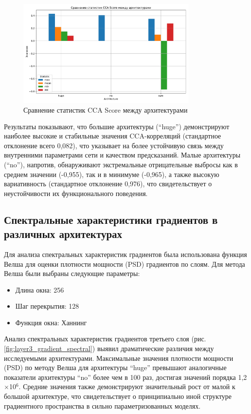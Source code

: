 \documentclass[a4paper,12pt]{article}
\begin{document}
\begin{figure}[ht]
  \centering
  \includegraphics[width=0.8\textwidth]{resources/cca_score_statistics_comparison.pdf}
  \caption{Сравнение статистик CCA Score между архитектурами}
  \label{fig:cca_score_comparison}
\end{figure}

Результаты показывают, что большие архитектуры (``huge'') демонстрируют наиболее высокие и стабильные
значения CCA-корреляций (стандартное отклонение всего 0,082), что указывает на более устойчивую связь между
внутренними параметрами сети и качеством предсказаний. Малые архитектуры (``no''), напротив, обнаруживают
экстремальные отрицательные выбросы как в среднем значении (-0,955), так и в минимуме (-0,965), а также
высокую вариативность (стандартное отклонение 0,976), что свидетельствует о неустойчивости их функционального поведения.

\subsection{Спектральные характеристики градиентов в различных архитектурах}

Для анализа спектральных характеристик градиентов была использована функция Велша для оценки плотности
мощности (PSD) градиентов по слоям. Для метода Велша были выбраны следующие
параметры:
\begin{itemize}
  \item Длина окна: 256
  \item Шаг перекрытия: 128
  \item Функция окна: Ханнинг
\end{itemize}

Анализ спектральных характеристик градиентов третьего слоя (рис. \ref{fig:layer3_gradient_spectral}) выявил
драматические различия между исследуемыми архитектурами. Максимальные значения плотности
мощности (PSD) по методу Велша для архитектуры ``huge'' превышают аналогичные показатели архитектуры ``no''
более чем в 100 раз, достигая значений порядка 1,2$\times$10$^6$. Средние значения также демонстрируют
значительный рост от малой к большой архитектуре, что свидетельствует о принципиально иной структуре
градиентного пространства в сильно параметризованных моделях.
\end{document}

